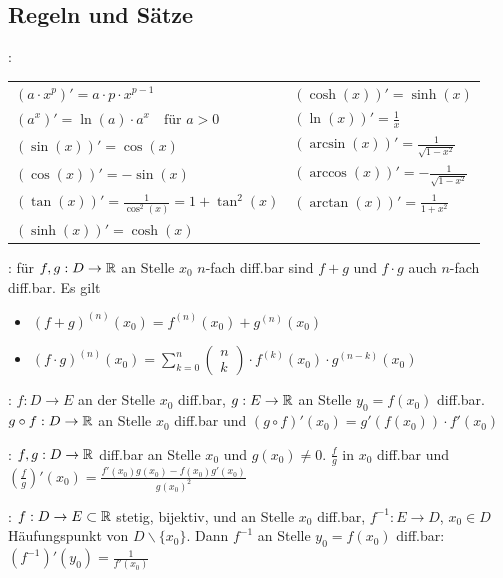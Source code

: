 \subsection{Regeln und Sätze}

\begin{minipage}{\linewidth}
\Satz {}:

\begin{tabular}{ll}
    $(a \cdot x^p)' = a \cdot p \cdot x^{p-1}$          & $(\cosh(x))' = \sinh(x)$ \\
    $(a^x)' = \ln(a) \cdot a^x \quad \text{für } a > 0$ & $(\ln(x))' = \frac{1}{x}$ \\
    $(\sin(x))' = \cos(x)$                              & $(\arcsin(x))' = \frac{1}{\sqrt{1 - x^2}}$\\
    $(\cos(x))' = -\sin(x)$                             & $(\arccos(x))' = -\frac{1}{\sqrt{1 - x^2}}$ \\
    $(\tan(x))' = \frac{1}{\cos^2(x)} = 1 + \tan^2(x)$  & $(\arctan(x))' = \frac{1}{1 + x^2}$ \\
    $(\sinh(x))' = \cosh(x)$
\end{tabular}
\end{minipage}

\Satz {}: für $f,g: D \to \mathbb{R}$ an Stelle $x_0$ $n$-fach diff.bar sind
$f+g$ und $f\cdot g$ auch $n$-fach diff.bar. Es gilt
\vspace{-0.6em}
\begin{itemize}
    \item $(f+g)^{(n)}(x_0) = f^{(n)}(x_0) + g^{(n)}(x_0)$
    \item $(f\cdot g)^{(n)}(x_0) = \sum_{k=0}^{n} \begin{pmatrix}n\\k\end{pmatrix} \cdot f^{(k)}(x_0) \cdot g^{(n-k)}(x_0)$
\end{itemize}

\Satz {}: $f: D \to E$ an der Stelle $x_0$ diff.bar, $g: E \to \mathbb{R}$
an Stelle $y_0 = f(x_0)$ diff.bar. $g \circ f: D \to \mathbb{R}$ an Stelle $x_0$ diff.bar und
$(g \circ f)'(x_0) = g'(f(x_0)) \cdot f'(x_0)$

\Satz {}: $f,g: D \to \mathbb{R}$ diff.bar an Stelle $x_0$ und $g(x_0) \ne 0$.
$\frac{f}{g}$ in $x_0$ diff.bar und $\left(\frac{f}{g}\right)'(x_0) = \frac{f'(x_0)g(x_0) - f(x_0)g'(x_0)}{g(x_0)^2}$

\Satz {}: $f: D \to E \subset \mathbb{R}$ stetig, bijektiv,  und an Stelle $x_0$ diff.bar,
$f^{-1}: E \to D$, $x_0 \in D$ Häufungspunkt von $D \backslash \{x_0\}$.
Dann $f^{-1}$ an Stelle $y_0 = f(x_0)$ diff.bar: $\left(f^{-1}\right)'(y_0) = \frac{1}{f'(x_0)}$


